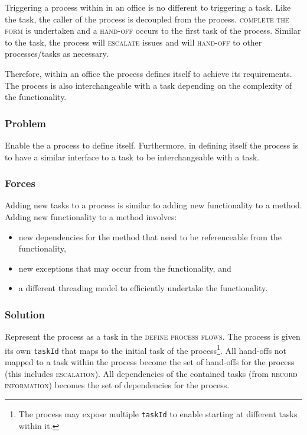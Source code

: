 \documentclass[prodmode]{style/acmlarge}
\begin{document}
Triggering a process within in an office is no different to triggering a task.
Like the task, the caller of the process is decoupled from the process.
\textsc{complete the form} is undertaken and a \textsc{hand-off} occurs to the
first task of the process.  Similar to the task, the process will
\textsc{escalate} issues and will \textsc{hand-off} to other processes/tasks as
necessary.

Therefore, within an office the process defines itself to achieve its
requirements.  The process is also interchangeable with a task depending on the
complexity of the functionality.

\subsubsection*{Problem} Enable the a process to define itself.  Furthermore, in
defining itself the process is to have a similar interface to a task to be
interchangeable with a task.

\subsubsection*{Forces} Adding new tasks to a process is similar to adding new
functionality to a method.  Adding new functionality to a method involves:
\begin{itemize}
  \item new dependencies for the method that need to be referenceable from the functionality,
  \item new exceptions that may occur from the functionality, and
  \item a different threading model to efficiently undertake the functionality. 
\end{itemize}

\subsubsection*{Solution} Represent the process as a task in the \textsc{define
process flows}.  The process is given its own \texttt{taskId} that maps to the
initial task of the process\footnote{The process may expose multiple
\texttt{taskId} to enable starting at different tasks within it.}.  All
hand-offs not mapped to a task within the process become the set of hand-offs
for the process (this includes \textsc{escalation}).  All dependencies of the
contained tasks (from \textsc{record information}) becomes the set of
dependencies for the process.
\end{document}
